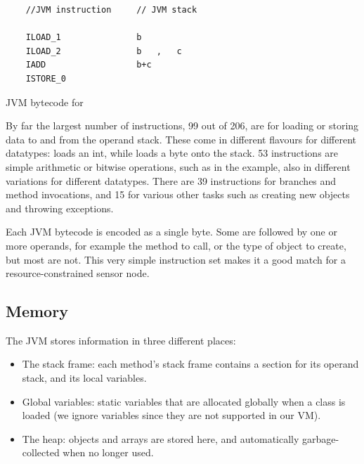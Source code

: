 \begin{listing}
    \centering
    \begin{verbatim}
    //JVM instruction     // JVM stack

    ILOAD_1               b
    ILOAD_2               b   ,   c
    IADD                  b+c
    ISTORE_0
    \end{verbatim}
\caption{JVM bytecode for }
\label{lst-basic-jvm-bytecode-example}
\end{listing}

By far the largest number of instructions, 99 out of 206, are for loading or storing data to and from the operand stack. These come in different flavours for different datatypes:  loads an int, while  loads a byte onto the stack. 53 instructions are simple arithmetic or bitwise operations, such as  in the example, also in different variations for different datatypes. There are 39 instructions for branches and method invocations, and 15 for various other tasks such as creating new objects and throwing exceptions.

Each JVM bytecode is encoded as a single byte. Some are followed by one or more operands, for example the method to call, or the type of object to create, but most are not. This very simple instruction set makes it a good match for a resource-constrained sensor node.

\subsection{Memory}
\label{sec-background-jvm-memory}
The JVM stores information in three different places:
\begin{itemize}
    \item The stack frame: each method's stack frame contains a section for its operand stack, and its local variables.
    \item Global variables: static variables that are allocated globally when a class is loaded (we ignore  variables since they are not supported in our VM).
    \item The heap: objects and arrays are stored here, and automatically garbage-collected when no longer used.
\end{itemize}

